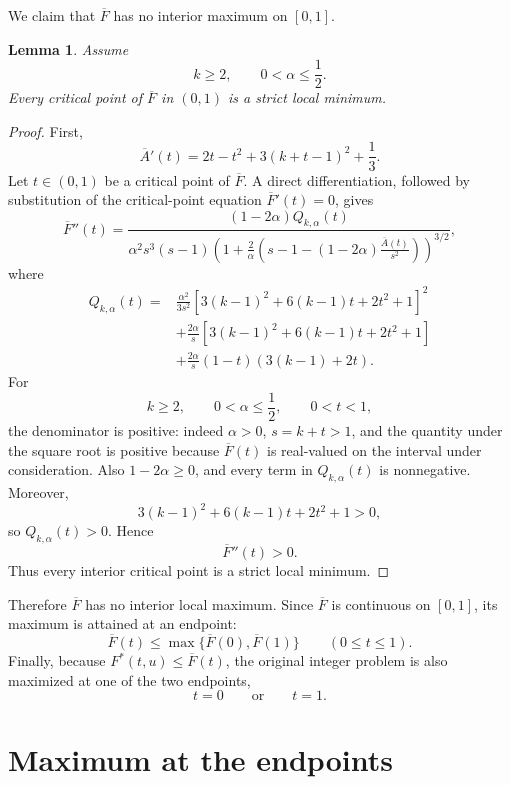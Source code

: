 \documentclass[11pt]{article}
\newtheorem{lemma}{Lemma}
\begin{document}
We claim that \(\overline F\) has no interior maximum on \([0,1]\).

\begin{lemma}
Assume
\[
        k\geq 2,\qquad 0<\alpha\leq \frac12.
\]
Every critical point of \(\overline F\) in \((0,1)\) is a strict local
minimum.
\end{lemma}

\begin{proof}
First,
\[
        \overline A'(t)
        =
        2t-t^2+3(k+t-1)^2+\frac13.
\]
Let \(t\in(0,1)\) be a critical point of \(\overline F\). A direct
differentiation, followed by substitution of the critical-point equation
\(\overline F'(t)=0\), gives
\[
        \overline F''(t)
        =
        \frac{
        (1-2\alpha)Q_{k,\alpha}(t)
        }{
        \alpha^2s^3(s-1)
        \left(
        1+\frac{2}{\alpha}
        \left(
        s-1-(1-2\alpha)\frac{\overline A(t)}{s^2}
        \right)
        \right)^{3/2}
        },
\]
where
\[
\begin{aligned}
Q_{k,\alpha}(t)
={}&
\frac{\alpha^2}{3s^2}
\left[
3(k-1)^2+6(k-1)t+2t^2+1
\right]^2                                      \\
&+
\frac{2\alpha}{s}
\left[
3(k-1)^2+6(k-1)t+2t^2+1
\right]                                      \\
&+
\frac{2\alpha}{s}
(1-t)\left(3(k-1)+2t\right).
\end{aligned}
\]
For
\[
        k\geq 2,\qquad 0<\alpha\leq \frac12,\qquad 0<t<1,
\]
the denominator is positive: indeed \(\alpha>0\), \(s=k+t>1\), and the
quantity under the square root is positive because \(\overline F(t)\) is
real-valued on the interval under consideration. Also \(1-2\alpha\geq 0\), and
every term in \(Q_{k,\alpha}(t)\) is nonnegative. Moreover,
\[
        3(k-1)^2+6(k-1)t+2t^2+1>0,
\]
so \(Q_{k,\alpha}(t)>0\). Hence
\[
        \overline F''(t)>0.
\]
Thus every interior critical point is a strict local minimum.
\end{proof}

Therefore \(\overline F\) has no interior local maximum. Since
\(\overline F\) is continuous on \([0,1]\), its maximum is attained at an
endpoint:
\[
        \overline F(t)
        \leq
        \max\{\overline F(0),\overline F(1)\}
        \qquad (0\leq t\leq 1).
\]
Finally, because \(F^*(t,u)\leq \overline F(t)\), the original integer
problem is also maximized at one of the two endpoints,
\[
        t=0
        \qquad\text{or}\qquad
        t=1.
\]

\section{Maximum at the endpoints}
\end{document}
